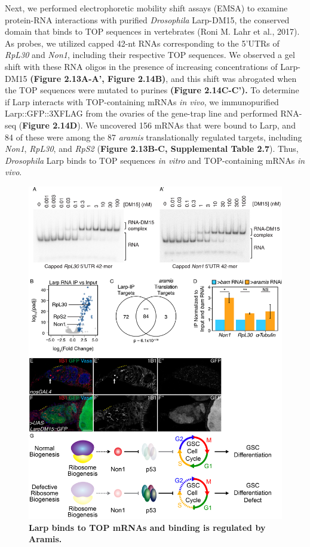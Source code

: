 \documentclass[12pt,oneside]{reedthesis}
\begin{document}
Next, we performed electrophoretic mobility shift assays (EMSA) to examine protein-RNA interactions with purified \emph{Drosophila} Larp-DM15, the conserved domain that binds to TOP sequences in vertebrates (Roni M. Lahr et al., 2017). As probes, we utilized capped 42-nt RNAs corresponding to the 5'UTRs of \emph{RpL30} and \emph{Non1}, including their respective TOP sequences. We observed a gel shift with these RNA oligos in the presence of increasing concentrations of Larp-DM15 \textbf{(Figure 2.13A-A', Figure 2.14B)}, and this shift was abrogated when the TOP sequences were mutated to purines \textbf{(Figure 2.14C-C').} To determine if Larp interacts with TOP-containing mRNAs \emph{in vivo}, we immunopurified Larp::GFP::3XFLAG from the ovaries of the gene-trap line and performed RNA-seq (\textbf{Figure 2.14D}). We uncovered 156 mRNAs that were bound to Larp, and 84 of these were among the 87 \emph{aramis} translationally regulated targets, including \emph{Non1}, \emph{RpL30}, and \emph{RpS2} (\textbf{Figure 2.13B-C, Supplemental Table 2.7}). Thus, \emph{Drosophila} Larp binds to TOP sequences \emph{in vitro} and TOP-containing mRNAs \emph{in vivo}.
\begin{figure}

{\centering \includegraphics[width=1\linewidth]{./figure/Ribosome Biogenesis/Ribosome Biogenesis 7} 

}

\caption[\textbf{Larp binds to TOP mRNAs and binding is regulated by Aramis.}]{\textbf{Larp binds to TOP mRNAs and binding is regulated by Aramis.}}\label{fig:unnamed-chunk-20}
\end{figure}
\end{document}
